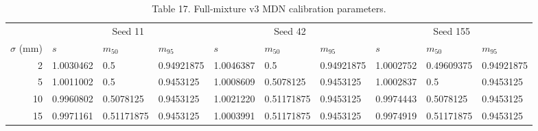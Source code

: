 \begin{table}[H]
  
  
  
  
  \caption{Table 17. Full-mixture v3 MDN calibration parameters.}
  \begin{tabular*}{\linewidth}{@{\extracolsep{\fill}}rlll@{\hspace{7pt}}lll@{\hspace{7pt}}lll@{}}
    \toprule
    & \multicolumn{3}{c}{Seed 11} & \multicolumn{3}{c}{Seed 42} & \multicolumn{3}{c}{Seed 155} \\
    \cmidrule(lr){2-4}\cmidrule(lr){5-7}\cmidrule(lr){8-10}
    $\sigma$ (mm) & $s$ & $m_{50}$ & $m_{95}$ & $s$ & $m_{50}$ & $m_{95}$ & $s$ & $m_{50}$ & $m_{95}$ \\
    \midrule
    2 & 1.0030462 & 0.5 & 0.94921875 & 1.0046387 & 0.5 & 0.94921875 & 1.0002752 & 0.49609375 & 0.94921875 \\
    5 & 1.0011002 & 0.5 & 0.9453125 & 1.0008609 & 0.5078125 & 0.9453125 & 1.0002837 & 0.5 & 0.9453125 \\
    10 & 0.9960802 & 0.5078125 & 0.9453125 & 1.0021220 & 0.51171875 & 0.9453125 & 0.9974443 & 0.5078125 & 0.9453125 \\
    15 & 0.9971161 & 0.51171875 & 0.9453125 & 1.0003991 & 0.51171875 & 0.9453125 & 0.9974919 & 0.51171875 & 0.9453125 \\
    \bottomrule
  \end{tabular*}
\end{table}

\endgroup
